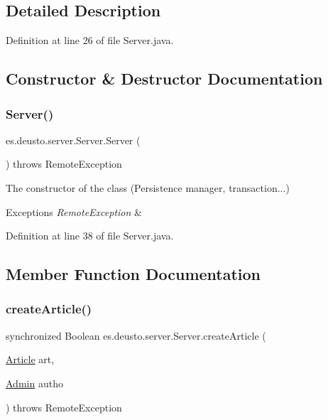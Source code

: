 \subsection{Detailed Description}


Definition at line 26 of file Server.\+java.



\subsection{Constructor \& Destructor Documentation}
\mbox{\label{classes_1_1deusto_1_1server_1_1_server_a84f78162a65dd737f224eb2f94c43023}} 
\subsubsection{\texorpdfstring{Server()}{Server()}}
{\footnotesize\ttfamily es.\+deusto.\+server.\+Server.\+Server (\begin{DoxyParamCaption}{ }\end{DoxyParamCaption}) throws Remote\+Exception}

The constructor of the class (Persistence manager, transaction...)


\begin{DoxyExceptions}{Exceptions}
{\em Remote\+Exception} & \\
\hline
\end{DoxyExceptions}


Definition at line 38 of file Server.\+java.



\subsection{Member Function Documentation}
\mbox{\label{classes_1_1deusto_1_1server_1_1_server_a58363d9c2c5c5d1e085e22deeeebf833}} 
\subsubsection{\texorpdfstring{create\+Article()}{createArticle()}}
{\footnotesize\ttfamily synchronized Boolean es.\+deusto.\+server.\+Server.\+create\+Article (\begin{DoxyParamCaption}\item[{\hyperlink{classes_1_1deusto_1_1server_1_1jdo_1_1_article}{Article}}]{art,  }\item[{\hyperlink{classes_1_1deusto_1_1server_1_1jdo_1_1_admin}{Admin}}]{autho }\end{DoxyParamCaption}) throws Remote\+Exception}

